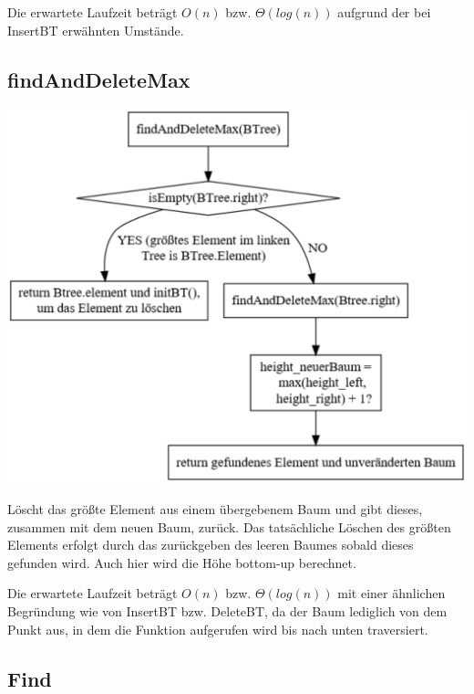 \documentclass[11pt]{article}
\begin{document}
    Die erwartete Laufzeit beträgt
    \begin{math}
        O(n)
    \end {math}
    bzw.
    \begin{math}
        \Theta (log (n))
    \end{math}
    aufgrund der bei InsertBT erwähnten Umstände.
    
    
    \subsection{findAndDeleteMax}\label{subsec:findanddeletemax}

    \begin{center}
        \includegraphics[width=0.8\columnwidth] {findanddeletemax.pdf}
    \end{center}

    Löscht das größte Element aus einem übergebenem Baum und gibt dieses, zusammen mit dem neuen Baum, zurück. Das tatsächliche Löschen des größten Elements erfolgt durch das zurückgeben des leeren Baumes sobald dieses gefunden wird. Auch hier wird die Höhe bottom-up berechnet.

    Die erwartete Laufzeit beträgt
    \begin{math}
        O(n)
    \end {math}
    bzw.
    \begin{math}
        \Theta (log (n))
    \end{math}
    mit einer ähnlichen Begründung wie von InsertBT bzw. DeleteBT, da der Baum lediglich von dem Punkt aus, in dem die Funktion aufgerufen wird bis nach unten traversiert.
    

    \subsection{Find}\label{subsec:find}
\end{document}
